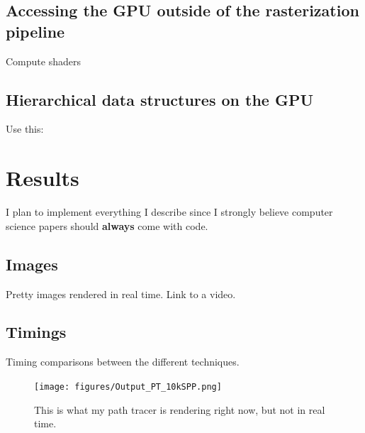\documentclass{ACGSeminar}
\begin{document}
\subsection{Accessing the GPU outside of the rasterization pipeline}
Compute shaders
\subsection{Hierarchical data structures on the GPU}
Use this: \cite{Karras:2012:MPC:2383795.2383801} \cite{Foley:2005}

\section{Results} \label{results}
I plan to implement everything I describe since I strongly believe computer science papers should \textbf{always} come with code.
\subsection{Images}
Pretty images rendered in real time. Link to a video.
\subsection{Timings}
Timing comparisons between the different techniques.


\begin{figure}[htb!]
  \begin{centering}
    \texttt{[image: figures/Output\_PT\_10kSPP.png]}\par
  \end{centering}
  \caption{This is what my path tracer is rendering right now, but not in real time.}
  \label{fig:pathtraced}
\end{figure}


\printbibliography
\cleardoublepage
\end{document}
